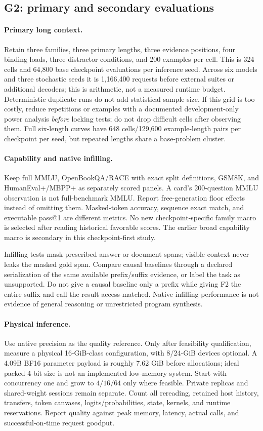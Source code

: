 \documentclass{article}
\theoremstyle{remark}\newtheorem{remark}[theorem]{Remark}
\begin{document}
\subsection{G2: primary and secondary evaluations}
\paragraph{Primary long context.}
Retain three families, three primary lengths, three evidence positions, four binding loads, three distractor conditions, and 200 examples per cell. This is 324 cells and 64,800 base checkpoint evaluations per inference seed. Across six models and three stochastic seeds it is 1,166,400 requests before external suites or additional decoders; this is arithmetic, not a measured runtime budget. Deterministic duplicate runs do not add statistical sample size. If this grid is too costly, reduce repetitions or examples with a documented development-only power analysis \emph{before} locking tests; do not drop difficult cells after observing them. Full six-length curves have 648 cells/129,600 example-length pairs per checkpoint per seed, but repeated lengths share a base-problem cluster.

\paragraph{Capability and native infilling.}
Keep full MMLU, OpenBookQA/RACE with exact split definitions, GSM8K, and HumanEval+/MBPP+ as separately scored panels. A card's 200-question MMLU observation is not full-benchmark MMLU. Report free-generation floor effects instead of omitting them. Masked-token accuracy, sequence exact match, and executable pass@1 are different metrics. No new checkpoint-specific family macro is selected after reading historical favorable scores. The earlier broad capability macro is secondary in this checkpoint-first study.

Infilling tests mask prescribed answer or document spans; visible context never leaks the masked gold span. Compare causal baselines through a declared serialization of the same available prefix/suffix evidence, or label the task as unsupported. Do not give a causal baseline only a prefix while giving F2 the entire suffix and call the result access-matched. Native infilling performance is not evidence of general reasoning or unrestricted program synthesis.

\paragraph{Physical inference.}
Use native precision as the quality reference. Only after feasibility qualification, measure a physical 16-GiB-class configuration, with 8/24-GiB devices optional. A 4.09B BF16 parameter payload is roughly 7.62 GiB before allocations; ideal packed 4-bit size is not an implemented low-memory system. Start with concurrency one and grow to $4/16/64$ only where feasible. Private replicas and shared-weight sessions remain separate. Count all rereading, retained host history, transfers, token canvases, logits/probabilities, state, kernels, and runtime reservations. Report quality against peak memory, latency, actual calls, and successful-on-time request goodput.
\end{document}
